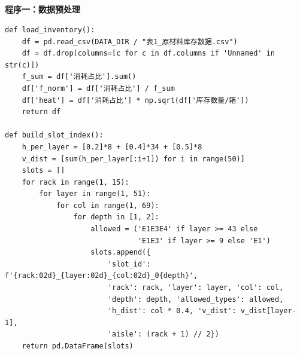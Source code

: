\documentclass[a4paper]{cumcmthesis}
\begin{document}
\newpage
\begin{appendices}
\section*{}
\textbf{程序一：数据预处理}
\begin{lstlisting}[style=pythonstyle, caption={数据加载与货位索引构建}]
def load_inventory():
    df = pd.read_csv(DATA_DIR / "表1_原材料库存数据.csv")
    df = df.drop(columns=[c for c in df.columns if 'Unnamed' in str(c)])
    f_sum = df['消耗占比'].sum()
    df['f_norm'] = df['消耗占比'] / f_sum
    df['heat'] = df['消耗占比'] * np.sqrt(df['库存数量/箱'])
    return df

def build_slot_index():
    h_per_layer = [0.2]*8 + [0.4]*34 + [0.5]*8
    v_dist = [sum(h_per_layer[:i+1]) for i in range(50)]
    slots = []
    for rack in range(1, 15):
        for layer in range(1, 51):
            for col in range(1, 69):
                for depth in [1, 2]:
                    allowed = ('E1E3E4' if layer >= 43 else
                               'E1E3' if layer >= 9 else 'E1')
                    slots.append({
                        'slot_id': f'{rack:02d}_{layer:02d}_{col:02d}_0{depth}',
                        'rack': rack, 'layer': layer, 'col': col,
                        'depth': depth, 'allowed_types': allowed,
                        'h_dist': col * 0.4, 'v_dist': v_dist[layer-1],
                        'aisle': (rack + 1) // 2})
    return pd.DataFrame(slots)
\end{lstlisting}


\end{appendices}
\end{document}
